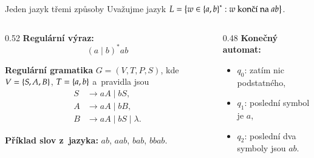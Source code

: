 \documentclass[11pt,professionalfont,aspectratio=43]{beamer}
\begin{document}
    \begin{frame}{Jeden jazyk třemi způsoby}
        Uvažujme jazyk $L=\left\{w\in\left\{a,b\right\}^{*} : w \text{ končí na } ab\right\}$.

        \begin{columns}[T]
            \begin{column}{0.52\textwidth}
                \textbf{Regulární výraz:}
                \[
                    (a\mid b)^*ab
                \]

                \textbf{Regulární gramatika} $G=(V,T,P,S)$, kde $V=\left\{S,A,B\right\}$, $T=\left\{a,b\right\}$ a~pravidla jsou
                \[
                \begin{aligned}
                    S &\to aA \mid bS,\\
                    A &\to aA \mid bB,\\
                    B &\to aA \mid bS \mid \lambda.
                \end{aligned}
                \]

                \textbf{Příklad slov z~jazyka:} $ab$, $aab$, $bab$, $bbab$.
            \end{column}

            \begin{column}{0.48\textwidth}
                \textbf{Konečný automat:}


                \begin{itemize}
                    \item $q_0$: zatím nic podstatného,
                    \item $q_1$: poslední symbol je $a$,
                    \item $q_2$: poslední dva symboly jsou $ab$.
                \end{itemize}
            \end{column}
        \end{columns}
    \end{frame}

\end{document}
